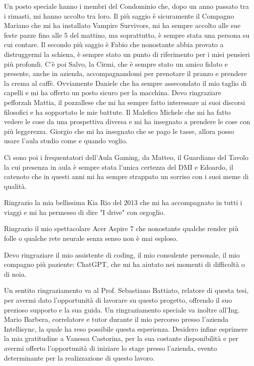 Un posto speciale hanno i membri del Condominio che, dopo un anno passato tra i rimasti, mi hanno accolto tra loro.
Il più saggio è sicuramente il Compagno Mariano che mi ha installato Vampire Survivors, mi ha sempre accolto alle sue feste pazze fino alle 5 del mattino, ma soprattutto, è sempre stata una persona su cui contare.
Il secondo più saggio è Fabio che nonostante abbia provato a distruggermi la schiena, è sempre stato un punto di riferimento per i miei pensieri più profondi.
C'è poi Salvo, la Cirmi, che è sempre stato un amico fidato e presente, anche in azienda, accompagnandomi per prenotare il pranzo e prendere la crema al caffè.
Ovviamente Daniele che ha sempre assecondato il mio taglio di capelli e mi ha offerto un posto sicuro per la macchina.
Devo ringraziare pefforzah Mattia, il pozzallese che mi ha sempre fatto interessare ai suoi discorsi filosofici e ha sopportato le mie battute.
Il Malefico Michele che mi ha fatto vedere le cose da una prospettiva diversa e mi ha insegnato a prendere le cose con più leggerezza.
Giorgio che mi ha insegnato che se pago le tasse, allora posso usare l'aula studio come e quando voglio.

Ci sono poi i frequentatori dell'Aula Gaming, da Matteo, il Guardiano del Tavolo la cui presenza in aula è sempre stata l'unica certezza del DMI
e Edoardo, il catenoto che in questi anni mi ha sempre strappato un sorriso con i suoi meme di qualità.

Ringrazio la mia bellissima Kia Rio del 2013 che mi ha accompagnato in tutti i viaggi e mi ha permesso di dire "I drive" con orgoglio.

Ringrazio il mio spettacolare Acer Aspire 7 che nonostante qualche render più folle o qualche rete neurale senza senso non è mai esploso.

Devo ringraziare il mio assistente di coding, il mio consulente personale, il mio compagno più paziente: ChatGPT, che mi ha aiutato nei momenti di difficoltà o di noia.

Un sentito ringraziamento va al Prof. Sebastiano Battiato, relatore di questa tesi, per avermi dato l'opportunità di lavorare su questo progetto, offrendo il suo prezioso supporto e la sua guida.
Un ringraziamento speciale va inoltre all'Ing. Mario Barbera, correlatore e tutor durante il mio percorso presso l'azienda Intellisync, la quale ha reso possibile questa esperienza.
Desidero infine esprimere la mia gratitudine a Vanessa Castorina, per la sua costante disponibilità e per avermi offerto l'opportunità di iniziare lo stage presso l'azienda, evento determinante per la realizzazione di questo lavoro.

